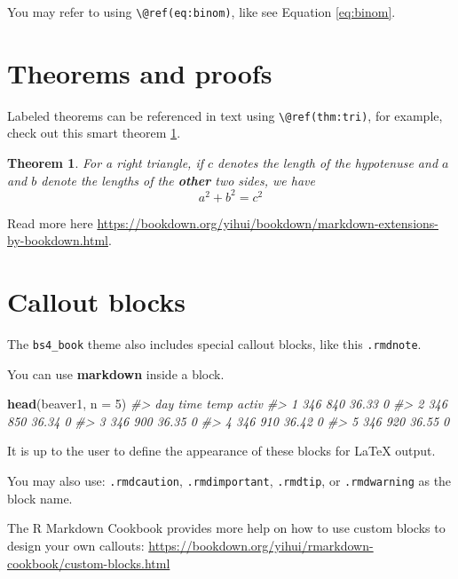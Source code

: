 \documentclass[
]{book}
\newenvironment{Shaded}{\begin{snugshade}}{\end{snugshade}}
\newcommand{\AttributeTok}[1]{\textcolor[rgb]{0.13,0.29,0.53}{#1}}
\newcommand{\CommentTok}[1]{\textcolor[rgb]{0.56,0.35,0.01}{\textit{#1}}}
\newcommand{\DecValTok}[1]{\textcolor[rgb]{0.00,0.00,0.81}{#1}}
\newcommand{\FunctionTok}[1]{\textcolor[rgb]{0.13,0.29,0.53}{\textbf{#1}}}
\newcommand{\NormalTok}[1]{#1}
\newtheorem{theorem}{Theorem}[chapter]
\theoremstyle{definition}
\theoremstyle{definition}
\theoremstyle{definition}
\theoremstyle{definition}
\theoremstyle{remark}
\begin{document}
You may refer to using \texttt{\textbackslash{}@ref(eq:binom)}, like see Equation \eqref{eq:binom}.

\hypertarget{theorems-and-proofs}{%
\section{Theorems and proofs}\label{theorems-and-proofs}}

Labeled theorems can be referenced in text using \texttt{\textbackslash{}@ref(thm:tri)}, for example, check out this smart theorem \ref{thm:tri}.

\begin{theorem}
\protect\hypertarget{thm:tri}{}\label{thm:tri}For a right triangle, if \(c\) denotes the \emph{length} of the hypotenuse
and \(a\) and \(b\) denote the lengths of the \textbf{other} two sides, we have
\[a^2 + b^2 = c^2\]
\end{theorem}

Read more here \url{https://bookdown.org/yihui/bookdown/markdown-extensions-by-bookdown.html}.

\hypertarget{callout-blocks}{%
\section{Callout blocks}\label{callout-blocks}}

The \texttt{bs4\_book} theme also includes special callout blocks, like this \texttt{.rmdnote}.

You can use \textbf{markdown} inside a block.

\begin{Shaded}
\begin{Highlighting}[]
\FunctionTok{head}\NormalTok{(beaver1, }\AttributeTok{n =} \DecValTok{5}\NormalTok{)}
\CommentTok{\#\textgreater{}   day time  temp activ}
\CommentTok{\#\textgreater{} 1 346  840 36.33     0}
\CommentTok{\#\textgreater{} 2 346  850 36.34     0}
\CommentTok{\#\textgreater{} 3 346  900 36.35     0}
\CommentTok{\#\textgreater{} 4 346  910 36.42     0}
\CommentTok{\#\textgreater{} 5 346  920 36.55     0}
\end{Highlighting}
\end{Shaded}

It is up to the user to define the appearance of these blocks for LaTeX output.

You may also use: \texttt{.rmdcaution}, \texttt{.rmdimportant}, \texttt{.rmdtip}, or \texttt{.rmdwarning} as the block name.

The R Markdown Cookbook provides more help on how to use custom blocks to design your own callouts: \url{https://bookdown.org/yihui/rmarkdown-cookbook/custom-blocks.html}
\end{document}
